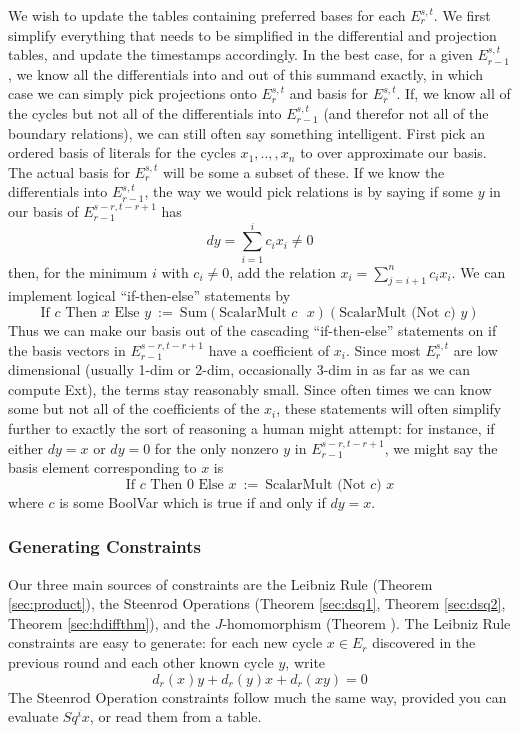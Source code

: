 We wish to update the tables containing preferred bases for each $E_r^{s,t}$.  
We first simplify everything that needs to be simplified in the differential and projection tables, and update the timestamps accordingly.
In the best case, for a given $E_{r-1}^{s,t}$, we know all the differentials into and out of this summand exactly, in which case we can simply pick projections onto
$E_{r}^{s,t}$ and basis for $E_r^{s,t}$.  
If, we know all of the cycles but not all of the differentials into $E_{r-1}^{s,t}$ (and therefor not all of the boundary relations), we can still often say something intelligent.  
First pick an ordered basis of literals for the cycles $x_1,..,,x_n$ to over approximate our basis.  The actual basis for $E_r^{s,t}$ will be some a subset of these.
If we know the differentials into $E_{r-1}^{s,t}$, the way we would pick relations is by saying if some $y$ in our basis of $E_{r-1}^{s-r,t-r+1}$ has
\[dy=\sum_{i=1}^ic_ix_i\ne 0\]
then, for the minimum $i$ with $c_i\ne 0$, add the relation $x_i=\sum_{j=i+1}^nc_ix_i$.  
We can implement logical ``if-then-else'' statements by 
\[\mbox{If $c$ Then $x$ Else $y$} ~:=~ \mbox{Sum} (\mbox{ScalarMult $c$ $x$}) (\mbox{ScalarMult (Not $c$) $y$})\]
Thus we can make our basis out of the cascading ``if-then-else'' statements on if the basis vectors in $E_{r-1}^{s-r,t-r+1}$ have a coefficient of $x_i$.
Since most $E_r^{s,t}$ are low dimensional (usually 1-dim or 2-dim, occasionally 3-dim in as far as we can compute Ext), the terms stay reasonably small.
Since often times we can know some but not all of the coefficients of the $x_i$, these statements will often simplify further to exactly the sort of reasoning a human might attempt: for instance, if either $dy=x$ or $dy=0$ for the only nonzero $y$ in $E_{r-1}^{s-r,t-r+1}$, we might say the basis element corresponding to $x$ is
\[\mbox{If $c$ Then $0$ Else $x$}~:=~\mbox{ScalarMult (Not $c$) $x$} \]
where $c$ is some BoolVar which is true if and only if $dy=x$.  

\subsubsection{Generating Constraints}

Our three main sources of constraints are the Leibniz Rule (Theorem \ref{sec:product}), the Steenrod Operations (Theorem \ref{sec:dsq1}, Theorem \ref{sec:dsq2}, Theorem \ref{sec:hdiffthm}), and the $J$-homomorphism  (Theorem \label{sec:jthm}).  
The Leibniz Rule constraints are easy to generate: for each new cycle $x\in E_r$ discovered in the previous round and each other known cycle $y$, write
\[d_r(x)y+d_r(y)x+d_r(xy)=0\]
The Steenrod Operation constraints follow much the same way, provided you can evaluate $Sq^ix$, or read them from a table.  

